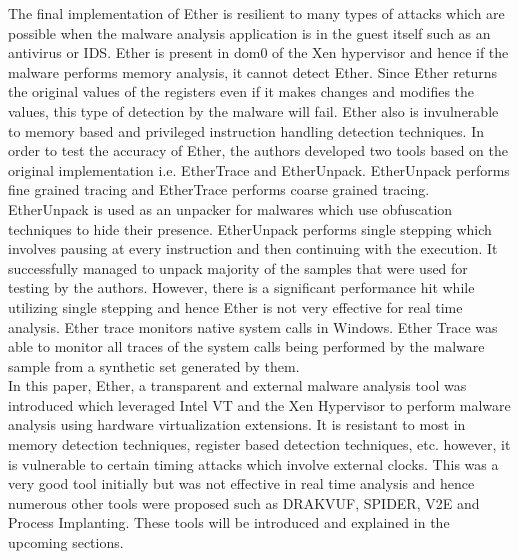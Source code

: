 \documentclass[11pt]{article}
\begin{document}
	The final implementation of Ether is resilient to many types of attacks which are possible when the malware analysis application is in the guest itself such as an antivirus or IDS. Ether is present in dom0 of the Xen hypervisor and hence if the malware performs memory analysis, it cannot detect Ether. Since Ether returns the original values of the registers even if it makes changes and modifies the values, this type of detection by the malware will fail. Ether also is invulnerable to memory based and privileged instruction handling detection techniques. In order to test the accuracy of Ether, the authors developed two tools based on the original implementation i.e. EtherTrace and EtherUnpack. EtherUnpack performs fine grained tracing and EtherTrace performs coarse grained tracing. EtherUnpack is used as an unpacker for malwares which use obfuscation techniques to hide their presence. EtherUnpack performs single stepping which involves pausing at every instruction and then continuing with the execution. It successfully managed to unpack majority of the samples that were used for testing by the authors. However, there is a significant performance hit while utilizing single stepping and hence Ether is not very effective for real time analysis. Ether trace monitors native system calls in Windows. Ether Trace was able to monitor all traces of the system calls being performed by the malware sample from a synthetic set generated by them.\\
	In this paper, Ether, a transparent and external malware analysis tool was introduced which leveraged Intel VT and the Xen Hypervisor to perform malware analysis using hardware virtualization extensions. It is resistant to most in memory detection techniques, register based detection techniques, etc. however, it is vulnerable to certain timing attacks which involve external clocks. This was a very good tool initially but was not effective in real time analysis and hence numerous other tools were proposed such as DRAKVUF, SPIDER, V2E and Process Implanting. These tools will be introduced and explained in the upcoming sections.
	
\end{document}
